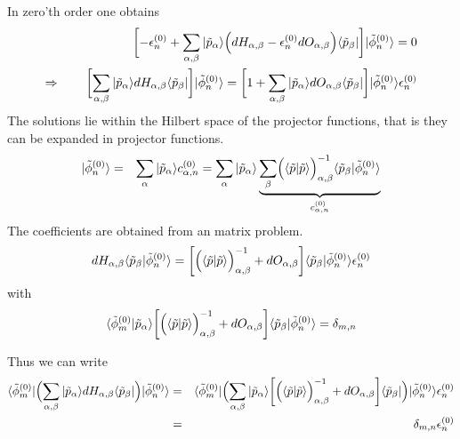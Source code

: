 \documentclass[11pt,a4paper]{report}
\begin{document}
In zero'th order one obtains
\begin{eqnarray}
\biggl[-\epsilon_n^{(0)}
+\sum_{\alpha,\beta}|\tilde{p}_\alpha\rangle
\Bigl(dH_{\alpha,\beta}-\epsilon_n^{(0)} dO_{\alpha,\beta}\Bigr)
\langle\tilde{p}_\beta|\biggr]|\tilde{\phi}_n^{(0)}\rangle=0
\nonumber\\
\Rightarrow\qquad
\biggl[\sum_{\alpha,\beta}|\tilde{p}_\alpha\rangle
dH_{\alpha,\beta}\langle\tilde{p}_\beta|\biggr]
|\tilde{\phi}_n^{(0)}\rangle
=
\biggl[1+\sum_{\alpha,\beta}|\tilde{p}_\alpha\rangle
dO_{\alpha,\beta}
\langle\tilde{p}_\beta|\biggr]|\tilde{\phi}_n^{(0)}\rangle\epsilon_n^{(0)}
\end{eqnarray}
The solutions lie within the Hilbert space of the projector
functions, that is they can be expanded in projector functions.
\begin{eqnarray}
|\tilde{\phi}_n^{(0)}\rangle&=&\sum_\alpha
|\tilde{p}_\alpha\rangle c^{(0)}_{\alpha,n}
=\sum_\alpha
|\tilde{p}_\alpha\rangle 
\underbrace{\sum_{\beta}
\Bigl(\langle\tilde{p}|\tilde{p}\rangle\Bigr)^{-1}_{\alpha,\beta}
\langle\tilde{p}_\beta|\tilde{\phi}_n^{(0)}\rangle
}_{c^{(0)}_{\alpha,n}}
\end{eqnarray}
The coefficients are obtained from an matrix problem.
\begin{eqnarray}
dH_{\alpha,\beta}
\langle\tilde{p}_\beta|\tilde{\phi}_n^{(0)}\rangle
=
\biggl[
\Bigl(\langle\tilde{p}|\tilde{p}\rangle\Bigr)^{-1}_{\alpha,\beta}
+
dO_{\alpha,\beta}\biggr]
\langle\tilde{p}_\beta|\tilde{\phi}_n^{(0)}\rangle\epsilon_n^{(0)}
\end{eqnarray}
with
\begin{eqnarray}
\langle\tilde{\phi}_m^{(0)}|\tilde{p}_\alpha\rangle
\biggl[
\Bigl(\langle\tilde{p}|\tilde{p}\rangle\Bigr)^{-1}_{\alpha,\beta}
+
dO_{\alpha,\beta}\biggr]
\langle\tilde{p}_\beta|\tilde{\phi}_n^{(0)}\rangle=\delta_{m,n}
\end{eqnarray}

Thus we can write
\begin{eqnarray}
\langle\tilde{\phi}_m^{(0)}|
\Bigl(\sum_{\alpha,\beta}|\tilde{p}_\alpha\rangle
dH_{\alpha,\beta}
\langle\tilde{p}_\beta|\Bigr)|\tilde{\phi}_n^{(0)}\rangle
&=&
\langle\tilde{\phi}_m^{(0)}|
\Bigl(\sum_{\alpha,\beta}|\tilde{p}_\alpha\rangle
\biggl[
\Bigl(\langle\tilde{p}|\tilde{p}\rangle\Bigr)^{-1}_{\alpha,\beta}
+
dO_{\alpha,\beta}\biggr]
\langle\tilde{p}_\beta|\Bigr)|\tilde{\phi}_n^{(0)}\rangle\epsilon_n^{(0)}
\nonumber\\
&=&\delta_{m,n}\epsilon_n^{(0)}
\end{eqnarray}
\end{document}
